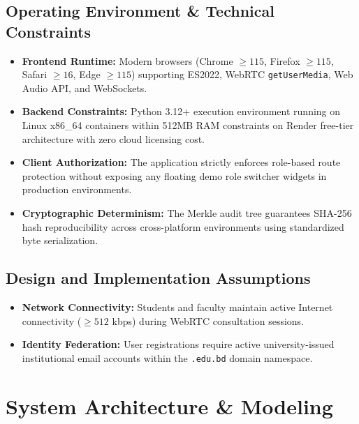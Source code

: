 \documentclass[10.5pt,a4paper]{article}
\begin{document}
\subsection{Operating Environment \& Technical Constraints}
\begin{itemize}[leftmargin=*]
    \item \textbf{Frontend Runtime:} Modern browsers (Chrome $\ge 115$, Firefox $\ge 115$, Safari $\ge 16$, Edge $\ge 115$) supporting ES2022, WebRTC \texttt{getUserMedia}, Web Audio API, and WebSockets.
    \item \textbf{Backend Constraints:} Python 3.12+ execution environment running on Linux x86\_64 containers within 512MB RAM constraints on Render free-tier architecture with zero cloud licensing cost.
    \item \textbf{Client Authorization:} The application strictly enforces role-based route protection without exposing any floating demo role switcher widgets in production environments.
    \item \textbf{Cryptographic Determinism:} The Merkle audit tree guarantees SHA-256 hash reproducibility across cross-platform environments using standardized byte serialization.
\end{itemize}

\subsection{Design and Implementation Assumptions}
\begin{itemize}[leftmargin=*]
    \item \textbf{Network Connectivity:} Students and faculty maintain active Internet connectivity ($\ge 512$ kbps) during WebRTC consultation sessions.
    \item \textbf{Identity Federation:} User registrations require active university-issued institutional email accounts within the \texttt{.edu.bd} domain namespace.
\end{itemize}

\clearpage

\section{System Architecture \& Modeling}
\end{document}
